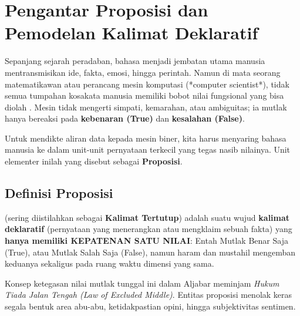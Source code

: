 \section{Pengantar Proposisi dan Pemodelan Kalimat Deklaratif}

Sepanjang sejarah peradaban, bahasa menjadi jembatan utama manusia mentransmisikan ide, fakta, emosi, hingga perintah. Namun di mata seorang matematikawan atau perancang mesin komputasi (*computer scientist*), tidak semua tumpahan kosakata manusia memiliki bobot nilai fungsional yang bisa diolah \cite{rosen2019}. Mesin tidak mengerti simpati, kemarahan, atau ambiguitas; ia mutlak hanya bereaksi pada \textbf{kebenaran (True)} dan \textbf{kesalahan (False)}.

Untuk mendikte aliran data kepada mesin biner, kita harus menyaring bahasa manusia ke dalam unit-unit pernyataan terkecil yang tegas nasib nilainya. Unit elementer inilah yang disebut sebagai \textbf{Proposisi}.

\subsection{Definisi Proposisi}

\begin{definisi}
 (sering diistilahkan sebagai \textbf{Kalimat Tertutup}) adalah suatu wujud \textbf{kalimat deklaratif} (pernyataan yang menerangkan atau mengklaim sebuah fakta) yang \textbf{hanya memiliki KEPATENAN SATU NILAI}: Entah Mutlak Benar Saja (True), atau Mutlak Salah Saja (False), namun haram dan mustahil mengemban keduanya sekaligus pada ruang waktu dimensi yang sama.
\end{definisi}

Konsep ketegasan nilai mutlak tunggal ini dalam Aljabar meminjam \textit{Hukum Tiada Jalan Tengah (Law of Excluded Middle)}. Entitas proposisi menolak keras segala bentuk area abu-abu, ketidakpastian opini, hingga subjektivitas sentimen.

